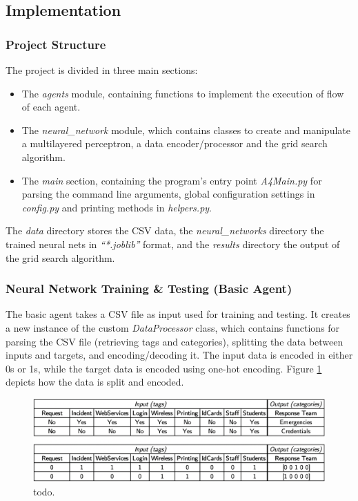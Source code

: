 \documentclass[letterpaper,12pt]{article}
\begin{document}

\subsection{Implementation}

\subsubsection{Project Structure}

The project is divided in three main sections:

\begin{itemize}
    \item The \textit{agents} module, containing functions to implement the execution of flow of each agent.
    \item The \textit{neural\_network} module, which contains classes to create and manipulate a multilayered perceptron, a data encoder/processor and the grid search algorithm.
    \item The \textit{main} section, containing the program's entry point \textit{A4Main.py} for parsing the command line arguments, global configuration settings in \textit{config.py} and printing methods in \textit{helpers.py}.
\end{itemize}

The \textit{data} directory stores the CSV data, the \textit{neural\_networks} directory the trained neural nets in \textit{``*.joblib''} format, and the \textit{results} directory the output of the grid search algorithm.


\subsubsection{Neural Network Training \& Testing (Basic Agent)}

The basic agent takes a CSV file as input used for training and testing. It creates a new instance of the custom \textit{DataProcessor} class, which contains functions for parsing the CSV file (retrieving tags and categories), splitting the data between inputs and targets, and encoding/decoding it. The input data is encoded in either 0s or 1s, while the target data is encoded using one-hot encoding. Figure \ref{fig:data_encoding} depicts how the data is split and encoded.

\begin{figure}[h] 
\centerline{\includegraphics[width=\textwidth]{report/figures/data_encoding.png}}
\caption{\label{fig:data_encoding}todo.}
\end{figure}
\end{document}
